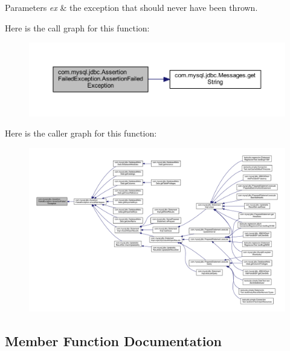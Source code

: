 \begin{DoxyParams}{Parameters}
{\em ex} & the exception that should never have been thrown. \\
\hline
\end{DoxyParams}
Here is the call graph for this function\+:\nopagebreak
\begin{figure}[H]
\begin{center}
\leavevmode
\includegraphics[width=350pt]{classcom_1_1mysql_1_1jdbc_1_1_assertion_failed_exception_a4e3aad4529bc6d57c1c58d52defe4cb8_cgraph}
\end{center}
\end{figure}
Here is the caller graph for this function\+:\nopagebreak
\begin{figure}[H]
\begin{center}
\leavevmode
\includegraphics[width=350pt]{classcom_1_1mysql_1_1jdbc_1_1_assertion_failed_exception_a4e3aad4529bc6d57c1c58d52defe4cb8_icgraph}
\end{center}
\end{figure}


\subsection{Member Function Documentation}
\mbox{\label{classcom_1_1mysql_1_1jdbc_1_1_assertion_failed_exception_a2477a2df55a2af9c8e127fc9a8a0fc34}} 
